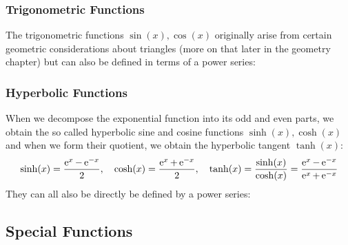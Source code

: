 

\subsubsection{Trigonometric Functions}
The trigonometric functions $\sin(x), \cos(x)$ originally arise from certain geometric considerations about triangles (more on that later in the geometry chapter) but can also be defined in terms of a power series:




\subsubsection{Hyperbolic Functions}
When we decompose the exponential function into its odd and even parts, we obtain the so called hyperbolic sine and cosine functions $\sinh(x), \cosh(x)$ and when we form their quotient, we obtain the hyperbolic tangent $\tanh(x)$:
\begin{equation}
 \sinh(x) =	\frac{\operatorname{\mathrm{e}}^x - \operatorname{\mathrm{e}}^{-x}}{2}, \quad	
 \cosh(x) =	\frac{\operatorname{\mathrm{e}}^x + \operatorname{\mathrm{e}}^{-x}}{2}, \quad
 \tanh(x) =	\frac{\sinh(x)}{\cosh(x)} 
          = \frac{\operatorname{\mathrm{e}}^x - \operatorname{\mathrm{e}}^{-x}}{\operatorname{\mathrm{e}}^x + \operatorname{\mathrm{e}}^{-x}}
\end{equation}
They can all also be directly be defined by a power series:




\subsection{Special Functions}

